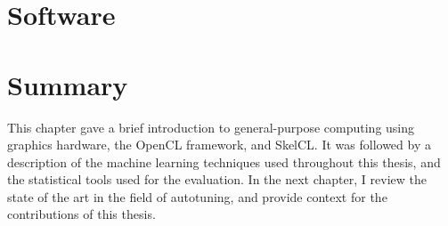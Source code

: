 \section{Software}


\section{Summary}

This chapter gave a brief introduction to general-purpose computing
using graphics hardware, the OpenCL framework, and SkelCL. It was
followed by a description of the machine learning techniques used
throughout this thesis, and the statistical tools used for the
evaluation. In the next chapter, I review the state of the art in the
field of autotuning, and provide context for the contributions of this
thesis.
